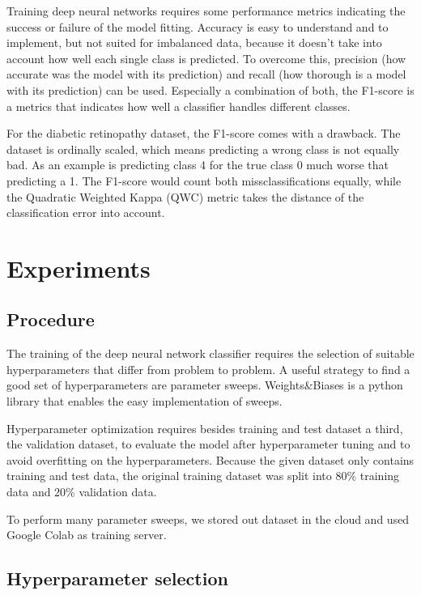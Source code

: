 \documentclass{article}
\begin{document}
Training deep neural networks requires some performance metrics indicating the success or failure of the model fitting. Accuracy
is easy to understand and to implement, but not suited for imbalanced data, because it doesn't take into account how well each 
single class is predicted. 
To overcome this, precision (how accurate was the model with its prediction) and recall (how thorough is a model with its prediction) can be used. 
Especially a combination of both, the F1-score is a metrics that indicates how well a classifier handles different classes.

For the diabetic retinopathy dataset, the F1-score comes with a drawback. The dataset is ordinally scaled, which means predicting 
a wrong class is not equally bad. As an example is predicting class 4 for the true class 0 much worse that predicting a 1. The
F1-score would count both missclassifications equally, while the Quadratic Weighted Kappa (QWC) metric takes the distance of 
the classification error into account.
\section{Experiments}
\subsection{Procedure}
The training of the deep neural network classifier requires the selection of suitable hyperparameters that differ from
problem to problem. A useful strategy to find a good set of hyperparameters are parameter sweeps. Weights\&Biases is a 
python library that enables the easy implementation of sweeps. 

Hyperparameter optimization requires besides training and test dataset a third, the validation dataset, to evaluate the
model after hyperparameter tuning and to avoid overfitting on the hyperparameters. Because the given dataset only contains 
training and test data, the original training dataset was split into 80\% training data and 20\% validation data.

To perform many parameter sweeps, we stored out dataset in the cloud and used Google Colab as training server. 

\subsection{Hyperparameter selection}\label{ch_hyperparam}
\end{document}
